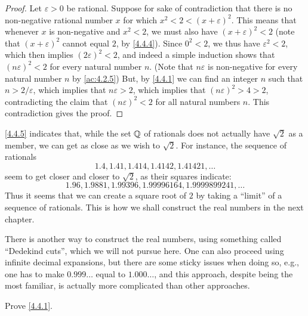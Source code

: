 \begin{proof}
  Let \(\varepsilon > 0\) be rational.
  Suppose for sake of contradiction that there is no non-negative rational number \(x\) for which \(x^2 < 2 < (x + \varepsilon)^2\).
  This means that whenever \(x\) is non-negative and \(x^2 < 2\), we must also have \((x + \varepsilon)^2 < 2\)
  (note that \((x + \varepsilon)^2\) cannot equal \(2\), by \cref{4.4.4}).
  Since \(0^2 < 2\), we thus have \(\varepsilon^2 < 2\), which then implies \((2\varepsilon)^2 < 2\), and indeed a simple induction shows that \((n\varepsilon)^2 < 2\) for every natural number \(n\).
  (Note that \(n\varepsilon\) is non-negative for every natural number \(n\) by \cref{ac:4.2.5})
  But, by \cref{4.4.1} we can find an integer \(n\) such that \(n > 2 / \varepsilon\), which implies that \(n\varepsilon > 2\), which implies that \((n\varepsilon)^2 > 4 > 2\), contradicting the claim that \((n\varepsilon)^2 < 2\) for all natural numbers \(n\).
  This contradiction gives the proof.
\end{proof}

\begin{note}
  \cref{4.4.5} indicates that, while the set \(\mathbb{Q}\) of rationals does not actually have \(\sqrt{2}\) as a member, we can get as close as we wish to \(\sqrt{2}\).
  For instance, the sequence of rationals
  \[
    1.4, 1.41, 1.414, 1.4142, 1.41421, \dots
  \]
  seem to get closer and closer to \(\sqrt{2}\), as their squares indicate:
  \[
    1.96, 1.9881, 1.99396, 1.99996164, 1.9999899241, \dots
  \]
  Thus it seems that we can create a square root of \(2\) by taking a ``limit'' of a sequence of rationals.
  This is how we shall construct the real numbers in the next chapter.
\end{note}

\begin{note}
  There is another way to construct the real numbers, using something called ``Dedekind cuts'', which we will not pursue here.
  One can also proceed using infinite decimal expansions, but there are some sticky issues when doing so, e.g., one has to make \(0.999\dots\) equal to \(1.000\dots\), and this approach, despite being the most familiar, is actually more complicated than other approaches.
\end{note}

\exercisesection

\begin{ex}\label{ex:4.4.1}
Prove \cref{4.4.1}.
\end{ex}

